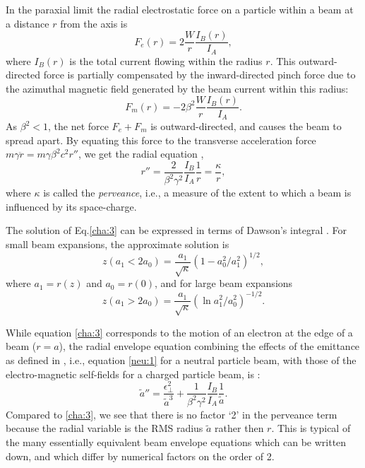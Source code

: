 \documentclass [12pt,a4paper,     ]{report} %
\begin{document}
	In the paraxial limit the radial electrostatic force on a particle within a beam at a distance $r$ from the axis is
%
\begin{equation}\label{cha:1} %
     F_e(r) = 2 \frac{W}{r} \frac{I_B(r)}{I_A},
\end{equation}
%
where $I_B(r)$ is the total current flowing within the radius $r$.  This outward-directed force is partially compensated by the inward-directed pinch force due to the azimuthal magnetic field generated by the beam current within this radius:
%
\begin{equation}\label{cha:2} %
     F_m(r) = -2 \beta^2 \frac{W}{r} \frac{I_B(r)}{I_A}.
\end{equation}
%
As $\beta^2 < 1$, the net force $F_e + F_m$ is outward-directed, and causes the beam to spread apart.  By equating this force to the transverse acceleration force $m\gamma \ddot{r} = m \gamma \beta^2 c^2 r''$, we get the radial equation \cite{LAWSO1958-, LAWSO1959-}, \cite[p.134]{LAWSO1977-}
%
\begin{equation}\label{cha:3} %
             r'' =  \frac{2}{\beta^2\gamma^2}  \frac{I_B}{I_A} \frac{1}{r}
                 =  \frac{\kappa}{r},
\end{equation}
%
where $\kappa$ is called the \emph{perveance}, i.e., a measure of the extent to which a beam is influenced by its space-charge.

   The solution of Eq.\eqref{cha:3} can be expressed in terms of Dawson's integral \cite{LAWSO1958-,HARRI1958-}.  For small beam expansions, the approximate solution is \cite{HARRI1958-}
%
\begin{equation}\label{cha:4} %
             z(a_1 < 2a_0) 
                 =  \frac{a_1}{\sqrt{\kappa}} (1 - a_0^2/a_1^2)^{1/2},
\end{equation}
%
where $a_1 = r(z)$ and $a_0 = r(0)$, and for large beam expansions \cite[p.319]{ABRAM1968-}
%
\begin{equation}\label{cha:5} %
             z(a_1 > 2a_0) 
                 =  \frac{a_1}{\sqrt{\kappa}} ( \ln a_1^2/a_0^2)^{-1/2}.
\end{equation}
%

	While equation \eqref{cha:3} corresponds to the motion of an electron at the edge of a beam ($r=a$), the radial envelope equation combining the effects of the emittance as defined in \cite{EMIGH1972-}, i.e., equation \eqref{neu:1} for a neutral particle beam, with those of the electro-magnetic self-fields for a charged particle beam, is \cite{LEE--1976A}:
%
\begin{equation}\label{cha:6} %
 \tilde{a}'' = \frac{\epsilon_{\perp}^2}{\tilde{a}^3}
             + \frac{1}{\beta^2\gamma^2} \frac{I_B}{I_A} \frac{1}{\tilde{a}}.
\end{equation}
%
Compared to \eqref{cha:3}, we see that there is no factor `2' in the perveance term because the radial variable is the RMS radius $\tilde{a}$ rather then $r$. This is typical of the many essentially equivalent beam envelope equations which can be written down, and which differ by numerical factors on the order of 2.
\end{document}
